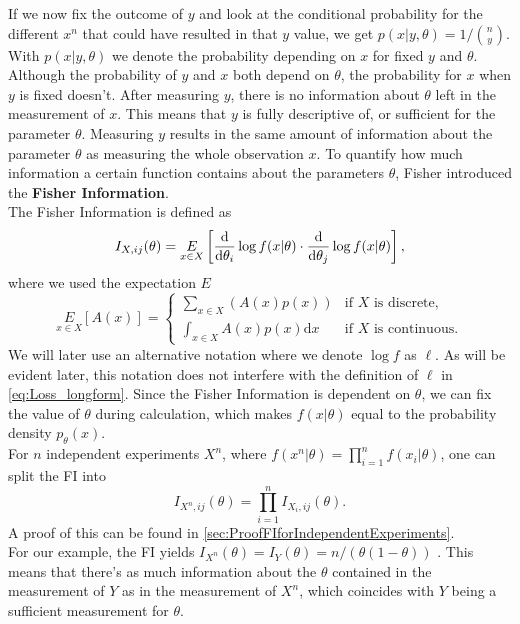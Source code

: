 If we now fix the outcome of $y$ and look at the conditional probability for the different $x^n$ that could have resulted in that $y$ value, we get $p(x|y,\theta) = 1/ \binom{n}{y}$. With $p(x|y,\theta)$ we denote the probability depending on $x$ for fixed $y$ and $\theta$. Although the probability of $y$ and $x$ both depend on $\theta$, the probability for $x$ when $y$ is fixed doesn't. After measuring $y$, there is no information about $\theta$ left in the measurement of $x$. This means that $y$ is fully descriptive of, or sufficient for the parameter $\theta$. Measuring $y$ results in the same amount of information about the parameter $\theta$ as measuring the whole observation $x$. To quantify how much information a certain function contains about the parameters $\theta$, Fisher introduced the \textbf{Fisher Information}.\\
The Fisher Information is defined as 
\begin{equation}\label{eq:FIDefinition}
	I_{X,ij}(\theta) = \underset{x\in X}{E} \left[\frac{\mathrm{d}}{\mathrm{d}\theta_i}\log f(x|\theta) \cdot \frac{\mathrm{d}}{\mathrm{d}\theta_j}\log f(x|\theta)\right],
\end{equation}
where we used the expectation $E$
\begin{equation}
	\underset{x\in X}{E} \left[A(x)\right] = 
	\begin{cases}
		\sum_{x\in X} \left(A(x) p(x)\right) &\text{if $X$ is discrete},\\
		\int_{x\in X} A(x) p(x) \mathrm{d}x &\text{if $X$ is continuous}.
	\end{cases}
\end{equation}
We will later use an alternative notation where we denote $\log f$ as $\ell$. As will be evident later, this notation does not interfere with the definition of $\ell$ in \cref{eq:Loss_longform}. Since the Fisher Information is dependent on $\theta$, we can fix the value of $\theta$ during calculation, which makes $f(x|\theta)$ equal to the probability density $p_\theta(x)$.\\ 
For $n$ independent experiments $X^n$, where $f(x^n|\theta) = \prod_{i=1}^n f(x_i|\theta)$, one can split the FI into 
\begin{equation}\label{eq:FIforIndependentExperiments}
	I_{X^n,ij}(\theta) = \prod_{i=1}^n I_{X_i,ij}(\theta).
\end{equation}
A proof of this can be found in \cref{sec:ProofFIforIndependentExperiments}.\\
For our example, the FI yields $I_{X^n}(\theta) = I_{Y}(\theta) = n/(\theta(1-\theta))$ \cite{StatisticFisherInfoTutorial}. This means that there's as much information about the $\theta$ contained in the measurement of $Y$ as in the measurement of $X^n$, which coincides with $Y$ being a sufficient measurement for $\theta$. \\
